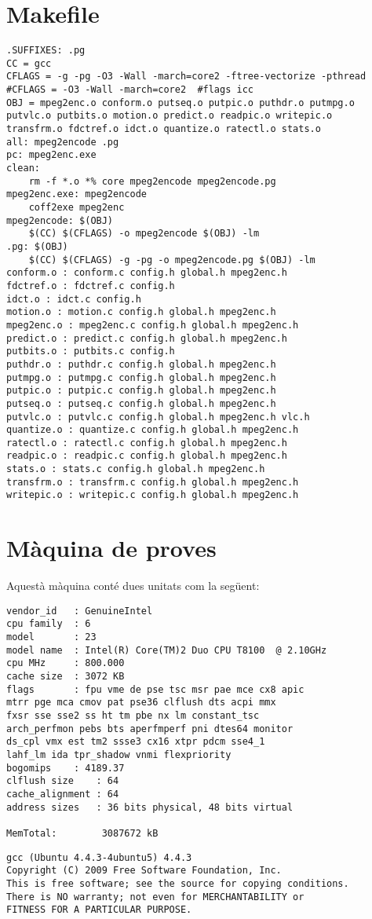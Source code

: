 \appendix
\chapter{Makefile}
\begin{lstlisting}
.SUFFIXES: .pg
CC = gcc
CFLAGS = -g -pg -O3 -Wall -march=core2 -ftree-vectorize -pthread
#CFLAGS = -O3 -Wall -march=core2  #flags icc
OBJ = mpeg2enc.o conform.o putseq.o putpic.o puthdr.o putmpg.o 
putvlc.o putbits.o motion.o predict.o readpic.o writepic.o 
transfrm.o fdctref.o idct.o quantize.o ratectl.o stats.o
all: mpeg2encode .pg
pc: mpeg2enc.exe
clean:
	rm -f *.o *% core mpeg2encode mpeg2encode.pg
mpeg2enc.exe: mpeg2encode
	coff2exe mpeg2enc
mpeg2encode: $(OBJ)
	$(CC) $(CFLAGS) -o mpeg2encode $(OBJ) -lm
.pg: $(OBJ)
	$(CC) $(CFLAGS) -g -pg -o mpeg2encode.pg $(OBJ) -lm
conform.o : conform.c config.h global.h mpeg2enc.h 
fdctref.o : fdctref.c config.h 
idct.o : idct.c config.h 
motion.o : motion.c config.h global.h mpeg2enc.h 
mpeg2enc.o : mpeg2enc.c config.h global.h mpeg2enc.h 
predict.o : predict.c config.h global.h mpeg2enc.h 
putbits.o : putbits.c config.h 
puthdr.o : puthdr.c config.h global.h mpeg2enc.h 
putmpg.o : putmpg.c config.h global.h mpeg2enc.h 
putpic.o : putpic.c config.h global.h mpeg2enc.h 
putseq.o : putseq.c config.h global.h mpeg2enc.h 
putvlc.o : putvlc.c config.h global.h mpeg2enc.h vlc.h 
quantize.o : quantize.c config.h global.h mpeg2enc.h 
ratectl.o : ratectl.c config.h global.h mpeg2enc.h 
readpic.o : readpic.c config.h global.h mpeg2enc.h 
stats.o : stats.c config.h global.h mpeg2enc.h 
transfrm.o : transfrm.c config.h global.h mpeg2enc.h 
writepic.o : writepic.c config.h global.h mpeg2enc.h 
\end{lstlisting}

\chapter{Màquina de proves}

Aquestà màquina conté dues unitats com la següent:
\begin{lstlisting}
vendor_id	: GenuineIntel
cpu family	: 6
model		: 23
model name	: Intel(R) Core(TM)2 Duo CPU T8100  @ 2.10GHz
cpu MHz		: 800.000
cache size	: 3072 KB
flags		: fpu vme de pse tsc msr pae mce cx8 apic 
mtrr pge mca cmov pat pse36 clflush dts acpi mmx 
fxsr sse sse2 ss ht tm pbe nx lm constant_tsc 
arch_perfmon pebs bts aperfmperf pni dtes64 monitor 
ds_cpl vmx est tm2 ssse3 cx16 xtpr pdcm sse4_1 
lahf_lm ida tpr_shadow vnmi flexpriority
bogomips	: 4189.37
clflush size	: 64
cache_alignment	: 64
address sizes	: 36 bits physical, 48 bits virtual

MemTotal:        3087672 kB

\end{lstlisting}


\begin{lstlisting}
gcc (Ubuntu 4.4.3-4ubuntu5) 4.4.3
Copyright (C) 2009 Free Software Foundation, Inc.
This is free software; see the source for copying conditions.  
There is NO warranty; not even for MERCHANTABILITY or 
FITNESS FOR A PARTICULAR PURPOSE.
\end{lstlisting}
